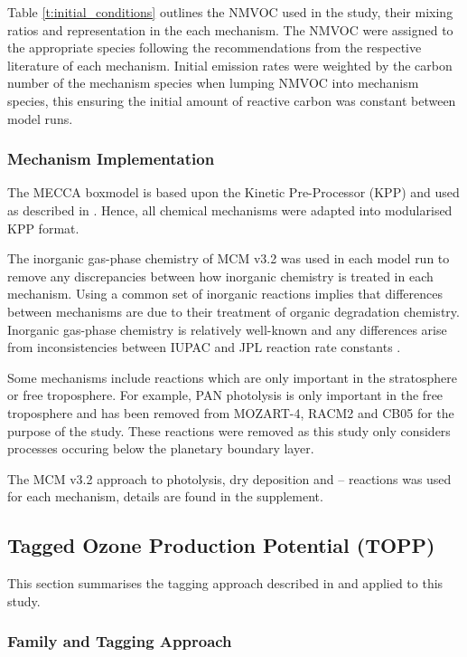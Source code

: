 Table \ref{t:initial_conditions} outlines the NMVOC used in the study, their mixing ratios and representation in the each mechanism.
The NMVOC were assigned to the appropriate species following the recommendations from the respective literature of each mechanism.
Initial emission rates were weighted by the carbon number of the mechanism species when lumping NMVOC into mechanism species, this ensuring the initial amount of reactive carbon was constant between model runs.

\subsubsection{Mechanism Implementation} %

The MECCA boxmodel \citep{Sander:2005} is based upon the Kinetic Pre-Processor (KPP) \citep{Damian:2002} and used as described in \citet{Butler:2011}. 
Hence, all chemical mechanisms were adapted into modularised KPP format.

The inorganic gas-phase chemistry of MCM v3.2 was used in each model run to remove any discrepancies between how inorganic chemistry is treated in each mechanism.
Using a common set of inorganic reactions implies that differences between mechanisms are due to their treatment of organic degradation chemistry.
Inorganic gas-phase chemistry is relatively well-known and any differences arise from inconsistencies between IUPAC and JPL reaction rate constants \citep{Emmerson:2009}.

Some mechanisms include reactions which are only important in the stratosphere or free troposphere.
For example, PAN photolysis is only important in the free troposphere \citep{Harwood:2003} and has been removed from MOZART-4, RACM2 and CB05 for the purpose of the study. 
These reactions were removed as this study only considers processes occuring below the planetary boundary layer.

The MCM v3.2 approach to photolysis, dry deposition and -- reactions was used for each mechanism, details are found in the supplement.

\subsection{Tagged Ozone Production Potential (TOPP)}
This section summarises the tagging approach described in \citet{Butler:2011} and applied to this study.

\subsubsection[Ox Family and Tagging Approach]{ Family and Tagging Approach} \label{ss:tagging} %

